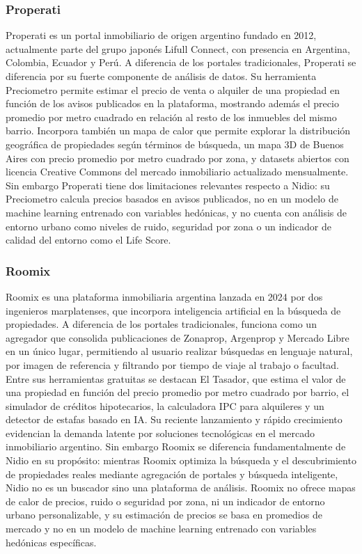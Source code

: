 \subsubsection{Properati}

Properati es un portal inmobiliario de origen argentino fundado en 2012, actualmente parte del grupo japonés Lifull Connect, con presencia en Argentina, Colombia, Ecuador y Perú. A diferencia de los portales tradicionales, Properati se diferencia por su fuerte componente de análisis de datos. Su herramienta Preciometro permite estimar el precio de venta o alquiler de una propiedad en función de los avisos publicados en la plataforma, mostrando además el precio promedio por metro cuadrado en relación al resto de los inmuebles del mismo barrio. Incorpora también un mapa de calor que permite explorar la distribución geográfica de propiedades según términos de búsqueda, un mapa 3D de Buenos Aires con precio promedio por metro cuadrado por zona, y datasets abiertos con licencia Creative Commons del mercado inmobiliario actualizado mensualmente. Sin embargo Properati tiene dos limitaciones relevantes respecto a Nidio: su Preciometro calcula precios basados en avisos publicados, no en un modelo de machine learning entrenado con variables hedónicas, y no cuenta con análisis de entorno urbano como niveles de ruido, seguridad por zona o un indicador de calidad del entorno como el Life Score.

\subsubsection{Roomix}

Roomix es una plataforma inmobiliaria argentina lanzada en 2024 por dos ingenieros marplatenses, que incorpora inteligencia artificial en la búsqueda de propiedades. A diferencia de los portales tradicionales, funciona como un agregador que consolida publicaciones de Zonaprop, Argenprop y Mercado Libre en un único lugar, permitiendo al usuario realizar búsquedas en lenguaje natural, por imagen de referencia y filtrando por tiempo de viaje al trabajo o facultad. Entre sus herramientas gratuitas se destacan El Tasador, que estima el valor de una propiedad en función del precio promedio por metro cuadrado por barrio, el simulador de créditos hipotecarios, la calculadora IPC para alquileres y un detector de estafas basado en IA. Su reciente lanzamiento y rápido crecimiento evidencian la demanda latente por soluciones tecnológicas en el mercado inmobiliario argentino. Sin embargo Roomix se diferencia fundamentalmente de Nidio en su propósito: mientras Roomix optimiza la búsqueda y el descubrimiento de propiedades reales mediante agregación de portales y búsqueda inteligente, Nidio no es un buscador sino una plataforma de análisis. Roomix no ofrece mapas de calor de precios, ruido o seguridad por zona, ni un indicador de entorno urbano personalizable, y su estimación de precios se basa en promedios de mercado y no en un modelo de machine learning entrenado con variables hedónicas específicas.

